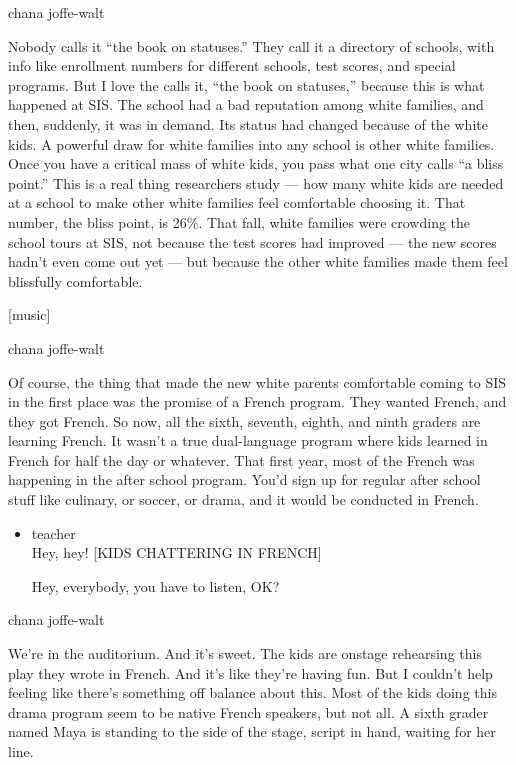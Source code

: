 chana joffe-walt

Nobody calls it ``the book on statuses.'' They call it a directory of
schools, with info like enrollment numbers for different schools, test
scores, and special programs. But I love the calls it, ``the book on
statuses,'' because this is what happened at SIS. The school had a bad
reputation among white families, and then, suddenly, it was in demand.
Its status had changed because of the white kids. A powerful draw for
white families into any school is other white families. Once you have a
critical mass of white kids, you pass what one city calls ``a bliss
point.'' This is a real thing researchers study --- how many white kids
are needed at a school to make other white families feel comfortable
choosing it. That number, the bliss point, is 26\%. That fall, white
families were crowding the school tours at SIS, not because the test
scores had improved --- the new scores hadn't even come out yet --- but
because the other white families made them feel blissfully comfortable.

{[}music{]}

chana joffe-walt

Of course, the thing that made the new white parents comfortable coming
to SIS in the first place was the promise of a French program. They
wanted French, and they got French. So now, all the sixth, seventh,
eighth, and ninth graders are learning French. It wasn't a true
dual-language program where kids learned in French for half the day or
whatever. That first year, most of the French was happening in the after
school program. You'd sign up for regular after school stuff like
culinary, or soccer, or drama, and it would be conducted in French.

\begin{itemize}
\item
  teacher\\
  Hey, hey! {[}KIDS CHATTERING IN FRENCH{]}

  Hey, everybody, you have to listen, OK?
\end{itemize}

chana joffe-walt

We're in the auditorium. And it's sweet. The kids are onstage rehearsing
this play they wrote in French. And it's like they're having fun. But I
couldn't help feeling like there's something off balance about this.
Most of the kids doing this drama program seem to be native French
speakers, but not all. A sixth grader named Maya is standing to the side
of the stage, script in hand, waiting for her line.

